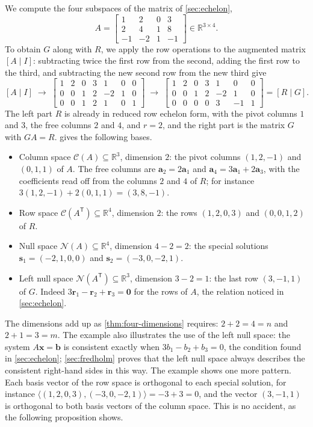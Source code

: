 We compute the four subspaces of the matrix of \cref{sec:echelon},
\[
A=\begin{bmatrix}1&2&0&3\\2&4&1&8\\-1&-2&1&-1\end{bmatrix}\in\mathbb R^{3\times4}.
\]
To obtain $G$ along with $R$, we apply the row operations to the augmented matrix $[A\mid I]$: subtracting twice the first row from the second, adding the first row to the third, and subtracting the new second row from the new third give
\[
[A\mid I]\;\longrightarrow\;
\left[\begin{array}{rrrr|rrr}1&2&0&3&1&0&0\\0&0&1&2&-2&1&0\\0&0&1&2&1&0&1\end{array}\right]
\;\longrightarrow\;
\left[\begin{array}{rrrr|rrr}1&2&0&3&1&0&0\\0&0&1&2&-2&1&0\\0&0&0&0&3&-1&1\end{array}\right]=[R\mid G].
\]
The left part $R$ is already in reduced row echelon form, with the pivot columns $1$ and $3$, the free columns $2$ and $4$, and $r=2$, and the right part is the matrix $G$ with $GA=R$.  gives the following bases.
\begin{itemize}
\item Column space $\mathcal C(A)\subseteq\mathbb R^3$, dimension $2$: the pivot columns $(1,2,-1)$ and $(0,1,1)$ of $A$. The free columns are $\mathbf a_2=2\mathbf a_1$ and $\mathbf a_4=3\mathbf a_1+2\mathbf a_3$, with the coefficients read off from the columns $2$ and $4$ of $R$; for instance $3(1,2,-1)+2(0,1,1)=(3,8,-1)$.
\item Row space $\mathcal C(A^{\mathsf T})\subseteq\mathbb R^4$, dimension $2$: the rows $(1,2,0,3)$ and $(0,0,1,2)$ of $R$.
\item Null space $\mathcal N(A)\subseteq\mathbb R^4$, dimension $4-2=2$: the special solutions $\mathbf s_1=(-2,1,0,0)$ and $\mathbf s_2=(-3,0,-2,1)$.
\item Left null space $\mathcal N(A^{\mathsf T})\subseteq\mathbb R^3$, dimension $3-2=1$: the last row $(3,-1,1)$ of $G$. Indeed $3\mathbf r_1-\mathbf r_2+\mathbf r_3=\mathbf 0$ for the rows of $A$, the relation noticed in \cref{sec:echelon}.
\end{itemize}
The dimensions add up as \cref{thm:four-dimensions} requires: $2+2=4=n$ and $2+1=3=m$. The example also illustrates the use of the left null space: the system $A\mathbf x=\mathbf b$ is consistent exactly when $3b_1-b_2+b_3=0$, the condition found in \cref{sec:echelon}; \cref{sec:fredholm} proves that the left null space always describes the consistent right-hand sides in this way. The example shows one more pattern. Each basis vector of the row space is orthogonal to each special solution, for instance $\langle(1,2,0,3),(-3,0,-2,1)\rangle=-3+3=0$, and the vector $(3,-1,1)$ is orthogonal to both basis vectors of the column space. This is no accident, as the following proposition shows.

